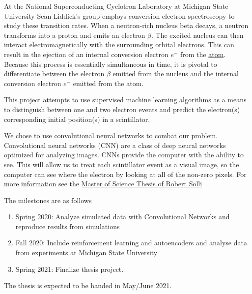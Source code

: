 \documentclass[%
oneside,                 %
final,                   %
10pt]{article}
\begin{document}
At the National Superconducting Cyclotron Laboratory at Michigan State University Sean Liddick's group employs conversion electron spectroscopy to study
these transition rates. When a neutron-rich nucleus beta decays, a
neutron transforms into a proton and emits an electron $\beta$. The
excited nucleus can then interact electromagnetically with the
surrounding orbital electrons. This can result in the ejection of an
internal conversion electron $e^{-}$ from the
\href{{https://www.sciencedirect.com/science/article/pii/S0065253908608884}}{atom}.
Because this process is essentially simultaneous in time, it is pivotal
to differentiate between the electron $\beta$ emitted from the
nucleus and the internal conversion electron $e^{-}$ emitted from
the atom.

This project attempts to use supervised machine learning algorithms as a
means to distinguish between one and two electron events and predict the
electron(s) corresponding initial position(s) in a scintillator.


We chose to use convolutional neural networks to combat our problem.
Convolutional neural networks (CNN) are a class of deep neural networks
optimized for analyzing images. CNNs provide the computer with the
ability to see. This will allow us to treat each scintillator event as a
visual image, so the computer can see where the electron by looking at
all of the non-zero pixels. 
For more information see the \href{{https://github.com/copperwire/thesis/blob/master/main.pdf}}{Master of Science Thesis of Robert Solli}

The milestones are as follows
\begin{enumerate}
\item Spring 2020: Analyze simulated data with Convolutional Networks and reproduce results from simulations

\item Fall 2020: Include reinforcement learning and autoencoders and analyse data from experiments at Michigan State University

\item Spring 2021: Finalize thesis project.
\end{enumerate}

\noindent
The thesis is expected to be handed in May/June  2021.


\end{document}
